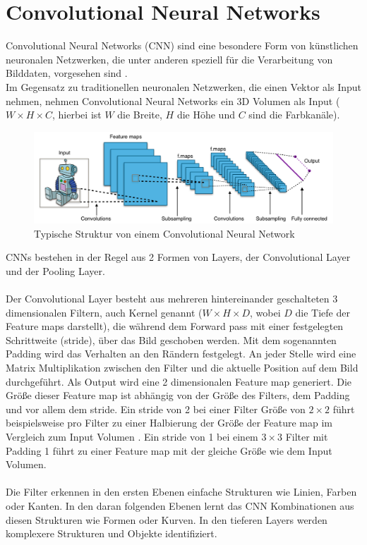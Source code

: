 \section{Convolutional Neural Networks}
Convolutional Neural Networks (\gls{CNN}) sind eine besondere Form von künstlichen neuronalen Netzwerken, die unter anderen speziell für 
die Verarbeitung von Bilddaten, vorgesehen sind \cite{convnet-erklaerung}.
\\
Im Gegensatz zu traditionellen neuronalen Netzwerken, die einen Vektor als Input nehmen, nehmen Convolutional Neural Networks ein 3D Volumen als Input
($ W \times H \times C $, hierbei ist $W$ die Breite, $H$ die Höhe und $C$ sind die Farbkanäle).

\begin{figure}[H]
  \centering
  \includegraphics[width=1\textwidth]{resources/cnn/typical_cnn.png}
  \caption{
    Typische Struktur von einem Convolutional Neural Network
    \cite{typical_cnn_img}
  }
  \label{image:typical_cnn_img}
\end{figure}


\gls{CNN}s bestehen in der Regel aus 2 Formen von \gls{Layer}s, der Convolutional \gls{Layer} und der Pooling Layer. 
\\
\\
Der Convolutional \gls{Layer} besteht aus mehreren hintereinander geschalteten 3 dimensionalen
Filtern, auch Kernel genannt ($ W \times H \times D$, wobei $D$ die Tiefe der Feature maps darstellt), die während dem Forward pass mit 
einer festgelegten Schrittweite (\gls{stride}), über das Bild geschoben werden. Mit dem sogenannten Padding wird das Verhalten an den Rändern festgelegt.
An jeder Stelle wird eine Matrix Multiplikation zwischen den Filter und die aktuelle Position auf dem Bild durchgeführt. 
Als Output wird eine 2 dimensionalen Feature map generiert. Die Größe dieser Feature map ist abhängig 
von der Größe des Filters, dem Padding und vor allem dem \gls{stride}. Ein \gls{stride} von 2 bei einer Filter Größe von $ 2\times2 $ führt beispielsweise 
pro Filter zu einer Halbierung der Größe der Feature map im Vergleich zum Input Volumen \cite{aufbau-funktion-convnet}.
Ein \gls{stride} von 1 bei einem $ 3\times3 $ Filter mit Padding 1 führt zu einer Feature map mit der gleiche Größe wie dem Input Volumen.
\\
\\
Die Filter erkennen in den ersten Ebenen einfache Strukturen wie Linien, Farben oder Kanten. In den daran folgenden Ebenen lernt das CNN Kombinationen aus 
diesen Strukturen wie Formen oder Kurven. In den tieferen \gls{Layer}s werden komplexere Strukturen und Objekte identifiziert. 

